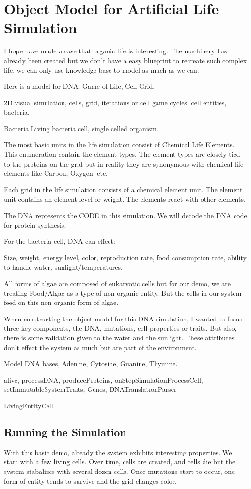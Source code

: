 \section{Object Model for Artificial Life Simulation}

I hope have made a case that organic life is interesting.  The machinery has
already been created but we don't have a easy blueprint to recreate such complex
life, we can only use knowledge base to model as much as we can.

Here is a model for DNA. Game of Life, Cell Grid.

2D visual simulation, cells, grid, iterations or cell game cycles, cell
entities, bacteria.

Bacteria Living bacteria cell, single celled organism.

The most basic units in the life simulation consist of
Chemical Life Elements.  This enumeration contain the element types.
The element types are closely tied to the proteins on the grid
but in reality they are synonymous with chemical life elements like Carbon, Oxygen, etc.

Each grid in the life simulation consists of a chemical element unit.
The element unit contains an element level or weight.  The elements
react with other elements.

The DNA represents the CODE in this simulation.
We will decode the DNA code for protein synthesis.

For the bacteria cell, DNA can effect:

Size, weight, energy level, color, reproduction rate, 
food consumption rate, ability to handle water, sunlight/temperatures.

All forms of algae are composed of eukaryotic cells but for our demo, we are treating 
Food/Algae as a type of non organic entity.  But the cells in our system feed on this non organic form of algae.

When constructing the object model for this DNA simulation, I wanted to focus
three key components, the DNA, mutations, cell properties or traits.  But also,
there is some validation given to the water and the sunlight.  These attributes
don't effect the system as much but are part of the environment.

Model DNA bases, Adenine, Cytosine, Guanine, Thymine.

alive, processDNA, produceProteins, onStepSimulationProcessCell,
setImmutableSystemTraits, Genes, DNATranslationParser

LivingEntityCell

\subsection{Running the Simulation} 

With this basic demo, already the system exhibits interesting properties.  We
start with a few living cells.  Over time, cells are created, and cells die but
the system stabalizes with  several dozen cells.  Once mutations start to occur,
one form of entity tends to survive and the grid changes color.
